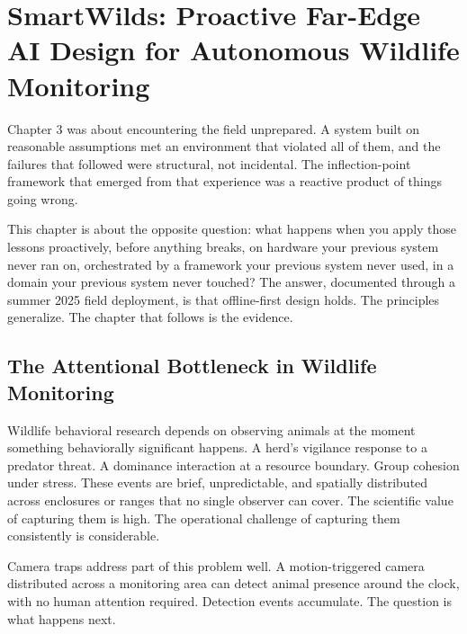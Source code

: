 
\chapter{SmartWilds: Proactive Far-Edge AI Design for Autonomous Wildlife Monitoring}
\label{ch:smartwilds}

Chapter 3 was about encountering the field unprepared. A system built on reasonable assumptions met an environment that violated all of them, and the failures that followed were structural, not incidental. The inflection-point framework that emerged from that experience was a reactive product of things going wrong.

This chapter is about the opposite question: what happens when you apply those lessons proactively, before anything breaks, on hardware your previous system never ran on, orchestrated by a framework your previous system never used, in a domain your previous system never touched? The answer, documented through a summer 2025 field deployment, is that offline-first design holds. The principles generalize. The chapter that follows is the evidence.

\section{The Attentional Bottleneck in Wildlife Monitoring}
\label{sec:ch4_intro}
Wildlife behavioral research depends on observing animals at the moment something behaviorally significant happens. A herd's vigilance response to a predator threat. A dominance interaction at a resource boundary. Group cohesion under stress. These events are brief, unpredictable, and spatially distributed across enclosures or ranges that no single observer can cover. The scientific value of capturing them is high. The operational challenge of capturing them consistently is considerable.

Camera traps address part of this problem well. A motion-triggered camera distributed across a monitoring area can detect animal presence around the clock, with no human attention required. Detection events accumulate. The question is what happens next.


